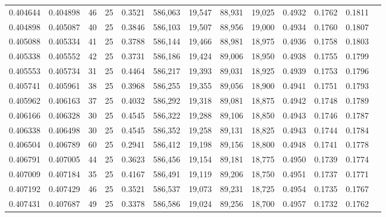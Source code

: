 \begin{tabular}{rrrrrrrrrrrrr}
0.404644 & 0.404898 &    46 &  25 &                                     0.3521 & 586,063 &  19,547 &  88,931 &  19,025 & 0.4932 & 0.1762 & 0.1811 \\
0.404898 & 0.405087 &    40 &  25 &                                     0.3846 & 586,103 &  19,507 &  88,956 &  19,000 & 0.4934 & 0.1760 & 0.1807 \\
0.405088 & 0.405334 &    41 &  25 &                                     0.3788 & 586,144 &  19,466 &  88,981 &  18,975 & 0.4936 & 0.1758 & 0.1803 \\
0.405338 & 0.405552 &    42 &  25 &                                     0.3731 & 586,186 &  19,424 &  89,006 &  18,950 & 0.4938 & 0.1755 & 0.1799 \\
0.405553 & 0.405734 &    31 &  25 &                                     0.4464 & 586,217 &  19,393 &  89,031 &  18,925 & 0.4939 & 0.1753 & 0.1796 \\
0.405741 & 0.405961 &    38 &  25 &                                     0.3968 & 586,255 &  19,355 &  89,056 &  18,900 & 0.4941 & 0.1751 & 0.1793 \\
0.405962 & 0.406163 &    37 &  25 &                                     0.4032 & 586,292 &  19,318 &  89,081 &  18,875 & 0.4942 & 0.1748 & 0.1789 \\
0.406166 & 0.406328 &    30 &  25 &                                     0.4545 & 586,322 &  19,288 &  89,106 &  18,850 & 0.4943 & 0.1746 & 0.1787 \\
0.406338 & 0.406498 &    30 &  25 &                                     0.4545 & 586,352 &  19,258 &  89,131 &  18,825 & 0.4943 & 0.1744 & 0.1784 \\
0.406504 & 0.406789 &    60 &  25 &                                     0.2941 & 586,412 &  19,198 &  89,156 &  18,800 & 0.4948 & 0.1741 & 0.1778 \\
0.406791 & 0.407005 &    44 &  25 &                                     0.3623 & 586,456 &  19,154 &  89,181 &  18,775 & 0.4950 & 0.1739 & 0.1774 \\
0.407009 & 0.407184 &    35 &  25 &                                     0.4167 & 586,491 &  19,119 &  89,206 &  18,750 & 0.4951 & 0.1737 & 0.1771 \\
0.407192 & 0.407429 &    46 &  25 &                                     0.3521 & 586,537 &  19,073 &  89,231 &  18,725 & 0.4954 & 0.1735 & 0.1767 \\
0.407431 & 0.407687 &    49 &  25 &                                     0.3378 & 586,586 &  19,024 &  89,256 &  18,700 & 0.4957 & 0.1732 & 0.1762 \\

\end{tabular}
